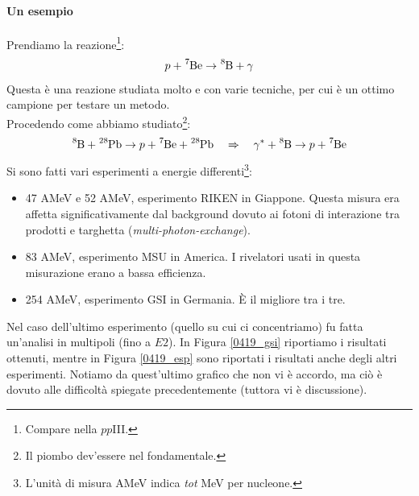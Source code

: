 \paragraph{Un esempio} Prendiamo la reazione\footnote{Compare nella $pp$III.}:
$$p+\ce{^7Be} \to \ce{^8B}+\gamma$$
Questa è una reazione studiata molto e con varie tecniche, per cui è un ottimo campione per testare un metodo.\\
Procedendo come abbiamo studiato\footnote{Il piombo dev'essere nel fondamentale.}:%
$$\ce{^8B} + \ce{^{28}Pb} \to p +  \ce{^7Be} + \ce{^{28}Pb} \quad \Rightarrow \quad \gamma^* + \ce{^8B} \to p+ \ce{^7Be}$$
Si sono fatti vari esperimenti a energie differenti\footnote{L'unità di misura AMeV indica \textit{tot} MeV per nucleone.}:
\begin{itemize}
	\item 47 AMeV e 52 AMeV, esperimento RIKEN in Giappone. Questa misura era affetta significativamente dal background dovuto ai fotoni di interazione tra prodotti e targhetta (\textit{multi-photon-exchange}).
	\item 83 AMeV, esperimento MSU in America. I rivelatori usati in questa misurazione erano a bassa efficienza.
	\item 254 AMeV, esperimento GSI in Germania. È il migliore tra i tre.
\end{itemize}
\noindent Nel caso dell'ultimo esperimento (quello su cui ci concentriamo) fu fatta un'analisi in multipoli (fino a $E2$). In Figura \ref{0419_gsi} riportiamo i risultati ottenuti, mentre in Figura \ref{0419_esp} sono riportati i risultati anche degli altri esperimenti. Notiamo da quest'ultimo grafico che non vi è accordo, ma ciò è dovuto alle difficoltà spiegate precedentemente (tuttora vi è discussione).

